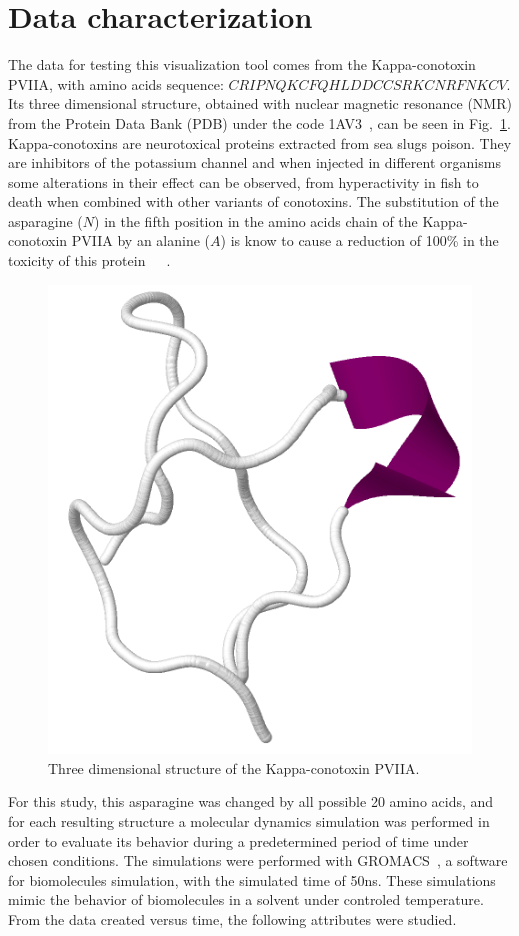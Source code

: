 \documentclass[10pt, conference]{IEEEtran}
\begin{document}
\section{Data characterization}

The data for testing this visualization tool comes from the Kappa-conotoxin PVIIA, with amino acids sequence: $CRIPNQKCFQHLDDCCSRKCNRFNKCV$. Its three dimensional structure, obtained with nuclear magnetic resonance (NMR) from the Protein Data Bank (PDB) under the code 1AV3~\cite{scanlon1997solution}, can be seen in Fig.~\ref{fig:pviia}. Kappa-conotoxins are neurotoxical proteins extracted from sea slugs poison. They are inhibitors of the potassium channel and when injected in different organisms some alterations in their effect can be observed, from hyperactivity in fish to death when combined with other variants of conotoxins. The substitution of the asparagine ($N$) in the fifth position in the amino acids chain of the Kappa-conotoxin PVIIA by an alanine ($A$) is know to cause a reduction of 100\% in the toxicity of this protein~\cite{jacobsen2000single}~\cite{mir2016conotoxins}~\cite{akey2002inherited}.

\begin{figure}
\includegraphics[width=0.7\linewidth]{figs/pviia.png}
\caption{Three dimensional structure of the Kappa-conotoxin PVIIA.} 
\label{fig:pviia}
\end{figure}

For this study, this asparagine was changed by all possible 20 amino acids, and for each resulting structure a molecular dynamics simulation was performed in order to evaluate its behavior during a predetermined period of time under chosen conditions. The simulations were performed with GROMACS~\cite{hess2008gromacs}, a software for biomolecules simulation, with the simulated time of 50ns. These simulations mimic the behavior of biomolecules in a solvent under controled temperature. From the data created versus time, the following attributes were studied.
\end{document}
